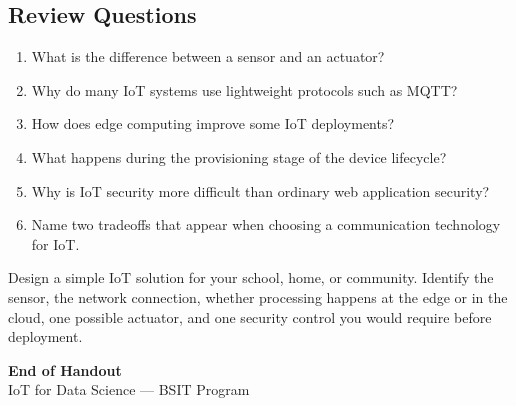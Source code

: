 \documentclass[11pt,a4paper]{article}
\begin{document}
\subsection{Review Questions}

\begin{enumerate}[leftmargin=*]
  \item What is the difference between a sensor and an actuator?
  \item Why do many IoT systems use lightweight protocols such as MQTT?
  \item How does edge computing improve some IoT deployments?
  \item What happens during the provisioning stage of the device lifecycle?
  \item Why is IoT security more difficult than ordinary web application security?
  \item Name two tradeoffs that appear when choosing a communication technology for IoT.
\end{enumerate}

\begin{examplebox}
Design a simple IoT solution for your school, home, or community. Identify the sensor, the network connection, whether processing happens at the edge or in the cloud, one possible actuator, and one security control you would require before deployment.
\end{examplebox}

\vfill
\begin{center}
{\large\textcolor{primary}{\textbf{End of Handout}}}\\[4pt]
{\small\textcolor{gray!70!black}{IoT for Data Science --- BSIT Program}}
\end{center}
\end{document}

